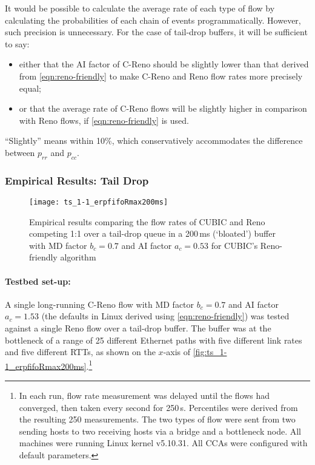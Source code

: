It would be possible to calculate the average rate of each type of flow by calculating the probabilities of each chain of events programmatically. However, such precision is unnecessary. For the case of tail-drop buffers, it will be sufficient to say:
\begin{itemize}
	\item either that the AI factor of C-Reno should be slightly lower than that derived from \autoref{eqn:reno-friendly} to make C-Reno and Reno flow rates more precisely equal;
	\item or that the average rate of C-Reno flows will be slightly higher in comparison with Reno flows, if \autoref{eqn:reno-friendly} is used.
\end{itemize}
``Slightly''  means within 10\%, which conservatively accommodates the difference between \(p_{rr}\) and \(p_{cc}\).


\subsubsection{Empirical Results: Tail Drop}\label{empirical-pfifo}

\begin{figure}
	\centering
	\texttt{[image: ts\_1-1\_erpfifoRmax200ms]}
	\caption{Empirical results comparing the flow rates of CUBIC and Reno competing 1:1 over a tail-drop queue in a 200\,ms (`bloated') buffer with MD factor \(b_c=0.7\) and AI factor \(a_c=0.53\) for CUBIC's Reno-friendly algorithm}\label{fig:ts_1-1_erpfifoRmax200ms}
\end{figure}

\paragraph{Testbed set-up:} A single long-running C-Reno flow with MD factor \(b_c = 0.7\) and AI factor \(a_c=1.53\) (the defaults in Linux derived using \autoref{eqn:reno-friendly}) was tested against a single Reno flow over a tail-drop buffer. The buffer was at the bottleneck of a range of 25 different Ethernet paths with five different link rates and five different RTTs, as shown on the \(x\)-axis of \autoref{fig:ts_1-1_erpfifoRmax200ms}.\footnote{In each run, flow rate measurement was delayed until the flows had converged, then taken every second for 250\,s. Percentiles were derived from the resulting 250 measurements. The two types of flow were sent from two sending hosts to two receiving hosts via a bridge and a bottleneck node. All machines were running Linux kernel v5.10.31. All CCAs were configured with default parameters.} 

